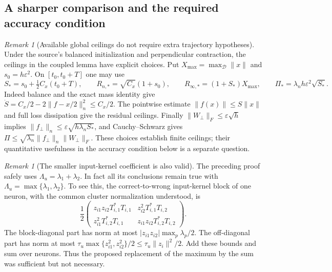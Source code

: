 \documentclass{article} %
\theoremstyle{plain}
\theoremstyle{definition}
\theoremstyle{remark}
\newtheorem{remark}[theorem]{Remark}
\begin{document}
\subsection{A sharper comparison and the required accuracy condition}
\begin{remark}[Available global ceilings do not require extra trajectory hypotheses]
\label{sbagg:global-ceilings}
Under the source's balanced initialization and perpendicular contraction,
the ceilings in the coupled lemma have explicit choices. Put
$X_{\max}=\max_{\mathcal D}\|x\|$ and $s_0=h\varepsilon^2$.
On $[t_0,t_0+T]$ one may use
\[
 S_*=s_0+\tfrac12C_x(t_0+T),\qquad
 R_{n,*}=\sqrt{C_x}(1+s_0),\qquad
 R_{\infty,*}=(1+S_*)X_{\max},\qquad
 \Pi_*=\lambda_n h\varepsilon^2\sqrt{S_*}.
\]
Indeed balance and the exact mass identity give
$\dot S=C_x/2-2\|f-x/2\|_n^2\le C_x/2$.
The pointwise estimate $\|f(x)\|\le S\|x\|$ and full loss dissipation
give the residual ceilings. Finally
$\|W_\perp\|_F\le\varepsilon\sqrt h$ implies
$\|f_\perp\|_n\le\varepsilon\sqrt{h\lambda_n S_*}$, and
Cauchy--Schwarz gives
$\Pi\le\sqrt{\lambda_n}\|f_\perp\|_n\|W_\perp\|_F$.
These choices establish finite ceilings; their quantitative usefulness
in the accuracy condition below is a separate question.
\end{remark}

\begin{remark}[The smaller input-kernel coefficient is also valid]
\label{sbagg:kernel-sharpening}
The preceding proof safely uses $\Lambda_u=\lambda_1+\lambda_2$.
In fact all its conclusions remain true with
$\Lambda_u=\max\{\lambda_1,\lambda_2\}$.
To see this, the correct-to-wrong input-kernel block of one neuron,
with the common cluster normalization understood, is
\[
 \frac12\begin{pmatrix}
 z_{i1}z_{i2}T_{i,1}^*T_{i,1}&z_{i2}^2T_{i,1}^*T_{i,2}\\
 z_{i1}^2T_{i,2}^*T_{i,1}&z_{i1}z_{i2}T_{i,2}^*T_{i,2}
 \end{pmatrix}.
\]
The block-diagonal part has norm at most
$|z_{i1}z_{i2}|\max_p\lambda_p/2$.
The off-diagonal part has norm at most
$\tau_u\max\{z_{i1}^2,z_{i2}^2\}/2
\le\tau_u\|z_i\|^2/2$.
Add these bounds and sum over neurons. Thus the proposed replacement
of the maximum by the sum was sufficient but not necessary.
\end{remark}
\end{document}
